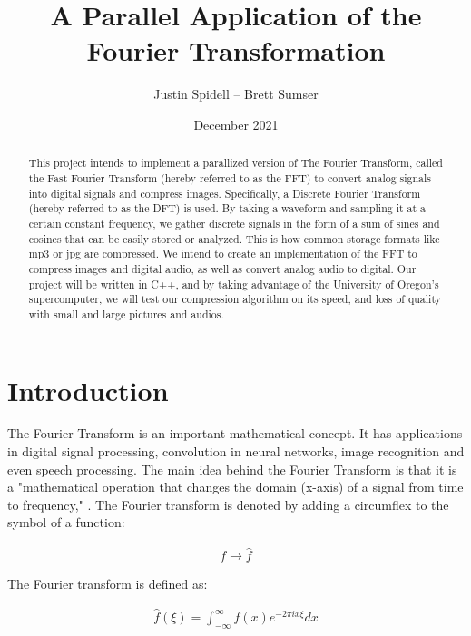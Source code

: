 \documentclass[12pt]{extarticle}
\title{A Parallel Application of the Fourier Transformation}
\author{Justin Spidell -- Brett Sumser}
\date{December 2021}
\begin{document}
 
\maketitle
\newpage
\begin{abstract}
\normalsize %

	This project intends to implement a parallized version of The Fourier Transform, called the Fast Fourier Transform (hereby referred to as the FFT) to convert analog signals into digital signals and compress images. 
	Specifically, a Discrete Fourier Transform (hereby referred to as the DFT) is used.
	By taking a waveform and sampling it at a certain constant frequency, we gather discrete signals in the form of a sum of sines and cosines that can be easily stored or analyzed.
	This is how common storage formats like mp3 or jpg are compressed.
	\newline
    \indent We intend to create an implementation of the FFT to compress images and digital audio, as well as convert analog audio to digital. 
    Our project will be written in C++, and by taking advantage of the University of Oregon's supercomputer, we will test our compression algorithm on its speed, and loss of quality with small and large pictures and audios.

\end{abstract}


\maketitle
\newpage
\section*{Introduction}

	The Fourier Transform is an important mathematical concept. It has applications
    in digital signal processing, convolution in neural networks, image recognition and even speech processing.
    The main idea behind the Fourier Transform is that it is a 
    "mathematical operation that changes the domain (x-axis) of a signal from time to frequency," \cite{Maklin:2019}. 
    The Fourier transform is denoted by adding a circumflex to the symbol of a function:

	\begin{align*}
		f \rightarrow \hat{f}
	\end{align*}

	The Fourier transform is defined as:

	\begin{align}
		\hat{f} (\xi)= \int^{\infty}_{-\infty}f(x) e^{-2 \pi i x \xi}dx
	\end{align}
\end{document}
